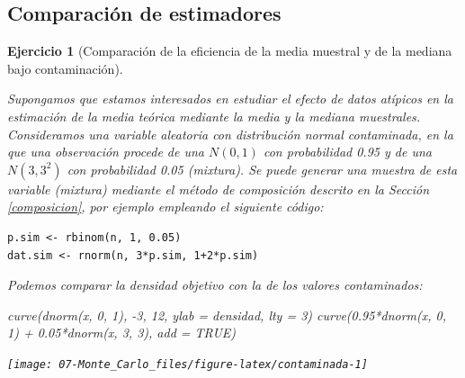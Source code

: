 \documentclass[
]{book}
\newenvironment{Shaded}{\begin{snugshade}}{\end{snugshade}}
\newcommand{\AttributeTok}[1]{\textcolor[rgb]{0.77,0.63,0.00}{#1}}
\newcommand{\ConstantTok}[1]{\textcolor[rgb]{0.00,0.00,0.00}{#1}}
\newcommand{\DecValTok}[1]{\textcolor[rgb]{0.00,0.00,0.81}{#1}}
\newcommand{\FloatTok}[1]{\textcolor[rgb]{0.00,0.00,0.81}{#1}}
\newcommand{\FunctionTok}[1]{\textcolor[rgb]{0.00,0.00,0.00}{#1}}
\newcommand{\NormalTok}[1]{#1}
\newcommand{\SpecialCharTok}[1]{\textcolor[rgb]{0.00,0.00,0.00}{#1}}
\newcommand{\StringTok}[1]{\textcolor[rgb]{0.31,0.60,0.02}{#1}}
\theoremstyle{break}
\newtheorem{exercise}{Ejercicio}[chapter]
\theoremstyle{nonumberplain}
\begin{document}
\hypertarget{comparaciuxf3n-de-estimadores}{%
\subsection{Comparación de estimadores}\label{comparaciuxf3n-de-estimadores}}

\begin{exercise}[Comparación de la eficiencia de la media muestral y de la mediana bajo contaminación]
\protect\hypertarget{exr:media-median}{}\label{exr:media-median}

Supongamos que estamos interesados en estudiar el efecto de datos atípicos en la estimación de la media teórica mediante la media y la mediana muestrales.
Consideramos una variable aleatoria con distribución normal contaminada, en la que una observación procede de una \(N(0,1)\) con probabilidad 0.95 y de una \(N(3,3^2)\) con probabilidad 0.05 (mixtura).
Se puede generar una muestra de esta variable (mixtura) mediante el método de composición descrito en la Sección \ref{composicion}, por ejemplo empleando el siguiente código:

\begin{verbatim}
p.sim <- rbinom(n, 1, 0.05)
dat.sim <- rnorm(n, 3*p.sim, 1+2*p.sim)
\end{verbatim}

Podemos comparar la densidad objetivo con la de los valores contaminados:

\begin{Shaded}
\begin{Highlighting}[]
\FunctionTok{curve}\NormalTok{(}\FunctionTok{dnorm}\NormalTok{(x, }\DecValTok{0}\NormalTok{, }\DecValTok{1}\NormalTok{), }\SpecialCharTok{{-}}\DecValTok{3}\NormalTok{, }\DecValTok{12}\NormalTok{, }\AttributeTok{ylab =} \StringTok{\textquotesingle{}densidad\textquotesingle{}}\NormalTok{, }\AttributeTok{lty =} \DecValTok{3}\NormalTok{)}
\FunctionTok{curve}\NormalTok{(}\FloatTok{0.95}\SpecialCharTok{*}\FunctionTok{dnorm}\NormalTok{(x, }\DecValTok{0}\NormalTok{, }\DecValTok{1}\NormalTok{) }\SpecialCharTok{+} \FloatTok{0.05}\SpecialCharTok{*}\FunctionTok{dnorm}\NormalTok{(x, }\DecValTok{3}\NormalTok{, }\DecValTok{3}\NormalTok{), }\AttributeTok{add =} \ConstantTok{TRUE}\NormalTok{)}
\end{Highlighting}
\end{Shaded}

\begin{center}\texttt{[image: 07-Monte\_Carlo\_files/figure-latex/contaminada-1]} \end{center}

\end{exercise}
\end{document}
